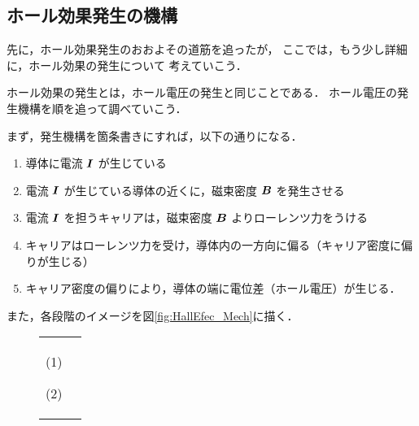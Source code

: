         \subsection{ホール効果発生の機構}
            先に，ホール効果発生のおおよその道筋を追ったが，
            ここでは，もう少し詳細に，ホール効果の発生について
            考えていこう．

            ホール効果の発生とは，ホール電圧の発生と同じことである．
            ホール電圧の発生機構を順を追って調べていこう．

            まず，発生機構を箇条書きにすれば，以下の通りになる．

                \begin{enumerate}
                    \item 導体に電流 $\boldsymbol{I}$ が生じている
                    \item 電流 $\boldsymbol{I}$ が生じている導体の近くに，磁束密度 $\boldsymbol{B}$ を発生させる
                    \item 電流 $\boldsymbol{I}$ を担うキャリアは，磁束密度 $\boldsymbol{B}$ よりローレンツ力をうける
                    \item キャリアはローレンツ力を受け，導体内の一方向に偏る（キャリア密度に偏りが生じる）
                    \item キャリア密度の偏りにより，導体の端に電位差（ホール電圧）が生じる．
                \end{enumerate}

            また，各段階のイメージを図\ref{fig:HallEfec_Mech}に描く．

                    \begin{figure}[htbp]
                        \begin{tabular}{cc}
                            \begin{minipage}{0.5\hsize}
                                  \begin{center}
                                      {HallEfect2.pdf}

                                      (1)
                                  \end{center}
                            \end{minipage}
                            \begin{minipage}{0.5\hsize}
                                \begin{center}
                                    {HallEfect3.pdf}

                                      (2)
                                \end{center}
                            \end{minipage}
                        \end{tabular}
                    \end{figure}

